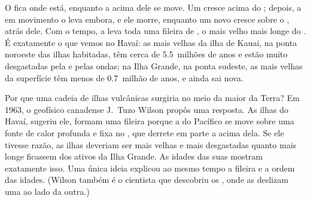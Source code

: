 O  fica onde está, enquanto a  acima dele se move. Um
 cresce acima do ; depois, a  em movimento o leva
embora, e ele morre, enquanto um novo  cresce sobre o ,
atrás dele. Com o tempo, a  leva toda uma fileira de , o mais
velho mais longe do . É exatamente o que vemos no Havaí: as
 mais velhas da ilha de Kauai, na ponta noroeste das ilhas
habitadas, têm cerca de 5.5~milhões de anos e estão muito desgastadas pela
 e pelas ondas; na Ilha Grande, na ponta sudeste, as  mais
velhas da superfície têm menos de 0.7~milhão de anos, e ainda sai 
nova.

\begin{history}
Por que uma cadeia de ilhas vulcânicas surgiria no meio da maior  da
Terra? Em 1963, o geofísico canadense J.~Tuzo Wilson propôs uma resposta.
As ilhas do Havaí, sugeriu ele, formam uma fileira porque a  do
Pacífico se move sobre uma fonte de calor profunda e fixa no , que
derrete em parte a  acima dela. Se ele tivesse razão, as ilhas
deveriam ser mais velhas e mais desgastadas quanto mais longe ficassem dos
 ativos da Ilha Grande. As idades das suas  mostram exatamente isso. Uma única ideia explicou ao mesmo tempo a fileira e a ordem das idades.
(Wilson também é o cientista que descobriu os , onde
as  deslizam uma ao lado da outra.)
\end{history}

